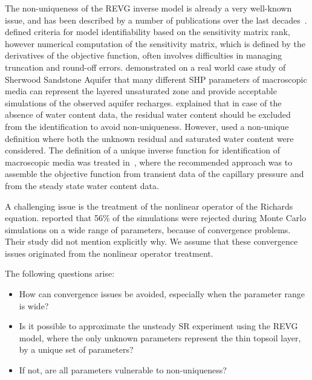 \documentclass[review,times,3p,twocolumn,10pt]{elsarticle}
\begin{document}
The non-uniqueness of the REVG inverse model is already a very well-known issue, and has been described by a number of publications over the last decades~\citep{kool1985, mous1993, ihlwang2003, beven2003-uncertain,Kowalsky04,Nakhaei, Kamali,pena17}.
\cite{mous1993} defined criteria for model identifiability based on the sensitivity matrix rank, however numerical computation of the sensitivity matrix, which is defined by the derivatives of the objective function, often involves difficulties in managing truncation and round-off errors.
\cite{beven2003-uncertain} demonstrated on a real world case study of Sherwood Sandstone Aquifer that many different SHP parameters of macroscopic media can represent the layered unsaturated zone and provide acceptable simulations of the observed aquifer recharges.  \cite{mous1993} explained that in case of the absence of water content data, the residual water content should be excluded from the identification to avoid non-uniqueness. However, \cite{beven2003-uncertain} used
a non-unique definition where both the unknown residual and saturated water content were considered.
The definition of a unique inverse function for identification of macroscopic media was treated in~\citep{zou200126}, where the recommended approach was to assemble the objective function from transient data of the capillary pressure and from the steady state water content data. %

A challenging issue is the treatment of the nonlinear operator of the Richards equation. \cite{beven2003-uncertain} reported that 56\% of the simulations were rejected during Monte Carlo simulations on a wide range of parameters, because of convergence problems. 
Their study did not mention explicitly why. We assume that these convergence issues originated from the nonlinear operator treatment.

The following questions arise: 
\begin{itemize}
\item How can convergence issues be avoided, especially when the parameter range is wide? 
\item Is it possible to approximate the unsteady SR experiment using the REVG model, where the only unknown parameters represent the thin topsoil layer, by a unique set of parameters? 
\item  If not, are all parameters vulnerable to non-uniqueness?
\end{itemize}
\end{document}
